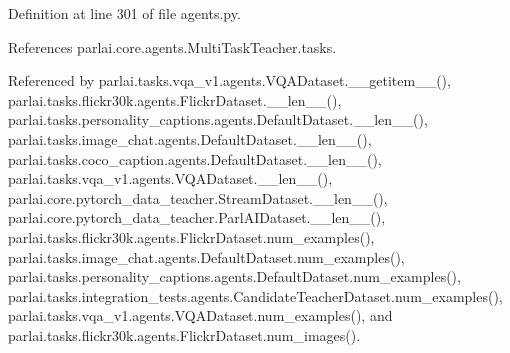 Definition at line 301 of file agents.\+py.



References parlai.\+core.\+agents.\+Multi\+Task\+Teacher.\+tasks.



Referenced by parlai.\+tasks.\+vqa\+\_\+v1.\+agents.\+V\+Q\+A\+Dataset.\+\_\+\+\_\+getitem\+\_\+\+\_\+(), parlai.\+tasks.\+flickr30k.\+agents.\+Flickr\+Dataset.\+\_\+\+\_\+len\+\_\+\+\_\+(), parlai.\+tasks.\+personality\+\_\+captions.\+agents.\+Default\+Dataset.\+\_\+\+\_\+len\+\_\+\+\_\+(), parlai.\+tasks.\+image\+\_\+chat.\+agents.\+Default\+Dataset.\+\_\+\+\_\+len\+\_\+\+\_\+(), parlai.\+tasks.\+coco\+\_\+caption.\+agents.\+Default\+Dataset.\+\_\+\+\_\+len\+\_\+\+\_\+(), parlai.\+tasks.\+vqa\+\_\+v1.\+agents.\+V\+Q\+A\+Dataset.\+\_\+\+\_\+len\+\_\+\+\_\+(), parlai.\+core.\+pytorch\+\_\+data\+\_\+teacher.\+Stream\+Dataset.\+\_\+\+\_\+len\+\_\+\+\_\+(), parlai.\+core.\+pytorch\+\_\+data\+\_\+teacher.\+Parl\+A\+I\+Dataset.\+\_\+\+\_\+len\+\_\+\+\_\+(), parlai.\+tasks.\+flickr30k.\+agents.\+Flickr\+Dataset.\+num\+\_\+examples(), parlai.\+tasks.\+image\+\_\+chat.\+agents.\+Default\+Dataset.\+num\+\_\+examples(), parlai.\+tasks.\+personality\+\_\+captions.\+agents.\+Default\+Dataset.\+num\+\_\+examples(), parlai.\+tasks.\+integration\+\_\+tests.\+agents.\+Candidate\+Teacher\+Dataset.\+num\+\_\+examples(), parlai.\+tasks.\+vqa\+\_\+v1.\+agents.\+V\+Q\+A\+Dataset.\+num\+\_\+examples(), and parlai.\+tasks.\+flickr30k.\+agents.\+Flickr\+Dataset.\+num\+\_\+images().

